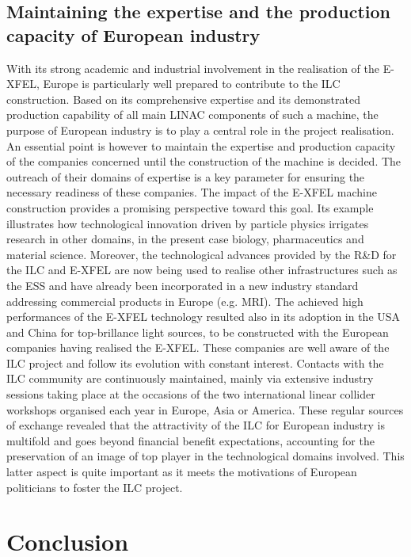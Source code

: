 \documentclass[%
 reprint,
 amsmath,amssymb,
 aps,
]{revtex4-1}
\begin{document}
\subsection{\label{sec:discussionInd}Maintaining the expertise and the production capacity of European industry}

With its strong academic and industrial involvement in the realisation of the E-XFEL, Europe is
particularly well prepared to contribute to the ILC construction. Based on its comprehensive expertise
and its demonstrated production capability of all main LINAC components of such a machine, the
purpose of European industry is to play a central role in the project realisation. An essential point
is however to maintain the expertise and production capacity of the companies concerned until the
construction of the machine is decided.
The outreach of their domains of expertise is a key parameter for ensuring the necessary readiness
of these companies. The impact of the E-XFEL machine construction provides a promising perspective
toward this goal. Its example illustrates how technological innovation driven by particle physics irrigates
research in other domains, in the present case biology, pharmaceutics and material science. Moreover, the technological advances provided by the R&D for the ILC and E-XFEL are now being used to realise
other infrastructures such as the ESS and have already been incorporated in a new industry standard
addressing commercial products in Europe (e.g. MRI). The achieved high performances of the E-XFEL
technology resulted also in its adoption in the USA and China for top-brillance light sources, to be
constructed with the European companies having realised the E-XFEL.
These companies are well aware of the ILC project and follow its evolution with constant interest.
Contacts with the ILC community are continuously maintained, mainly via extensive industry sessions
taking place at the occasions of the two international linear collider workshops organised each year in
Europe, Asia or America. These regular sources of exchange revealed that the attractivity of the ILC
for European industry is multifold and goes beyond financial benefit expectations, accounting for the
preservation of an image of top player in the technological domains involved. This latter aspect is quite
important as it meets the motivations of European politicians to foster the ILC project.

\section{Conclusion}



\end{document}
